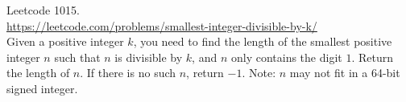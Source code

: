   Leetcode 1015.\\
  \url{https://leetcode.com/problems/smallest-integer-divisible-by-k/}\\
  Given a positive integer $k$, you need to find the length of the smallest positive integer
  $n$ such that $n$ is divisible by $k$, and $n$ only contains the digit $1$.
  Return the length of $n$. If there is no such $n$, return $-1$.
  Note: $n$ may not fit in a 64-bit signed integer.
